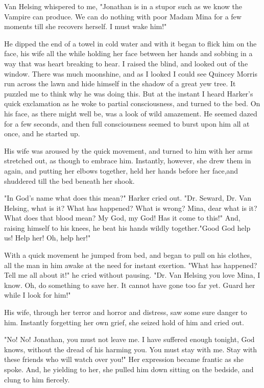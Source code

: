 Van Helsing whispered to me, "Jonathan is in a stupor such as we know the Vampire can produce. We can do nothing with poor Madam Mina for a few moments till she recovers herself. I must wake him!" 

He dipped the end of a towel in cold water and with it began to flick him on the face, his wife all the while holding her face between her hands and sobbing in a way that was heart breaking to hear. I raised the blind, and looked out of the window. There was much moonshine, and as I looked I could see Quincey Morris run across the lawn and hide himself in the shadow of a great yew tree. It puzzled me to think why he was doing this. But at the instant I heard Harker's quick exclamation as he woke to partial consciousness, and turned to the bed. On his face, as there might well be, was a look of wild amazement. He seemed dazed for a few seconds, and then full consciousness seemed to burst upon him all at once, and he started up. 

His wife was aroused by the quick movement, and turned to him with her arms stretched out, as though to embrace him. Instantly, however, she drew them in again, and putting her elbows together, held her hands before her face,and shuddered till the bed beneath her shook. 

"In God's name what does this mean?" Harker cried out. "Dr. Seward, Dr. Van Helsing, what is it? What has happened? What is wrong? Mina, dear what is it? What does that blood mean? My God, my God! Has it come to this!" And, raising himself to his knees, he beat his hands wildly together."Good God help us! Help her! Oh, help her!" 

With a quick movement he jumped from bed, and began to pull on his clothes, all the man in him awake at the need for instant exertion. "What has happened? Tell me all about it!" he cried without pausing. "Dr. Van Helsing you love Mina, I know. Oh, do something to save her. It cannot have gone too far yet. Guard her while I look for him!" 

His wife, through her terror and horror and distress, saw some sure danger to him. Instantly forgetting her own grief, she seized hold of him and cried out. 

"No! No! Jonathan, you must not leave me. I have suffered enough tonight, God knows, without the dread of his harming you. You must stay with me. Stay with these friends who will watch over you!" Her expression became frantic as she spoke. And, he yielding to her, she pulled him down sitting on the bedside, and clung to him fiercely. 

